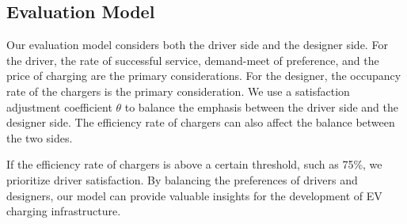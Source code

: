 \subsection{Evaluation Model}
Our evaluation model considers both the driver side and the designer side. For the driver, the rate of successful service, demand-meet of preference, and the price of charging are the primary considerations. For the designer, the occupancy rate of the chargers is the primary consideration. We use a satisfaction adjustment coefficient $\theta$ to balance the emphasis between the driver side and the designer side. The efficiency rate of chargers can also affect the balance between the two sides.

If the efficiency rate of chargers is above a certain threshold, such as 75\%, we prioritize driver satisfaction. By balancing the preferences of drivers and designers, our model can provide valuable insights for the development of EV charging infrastructure.